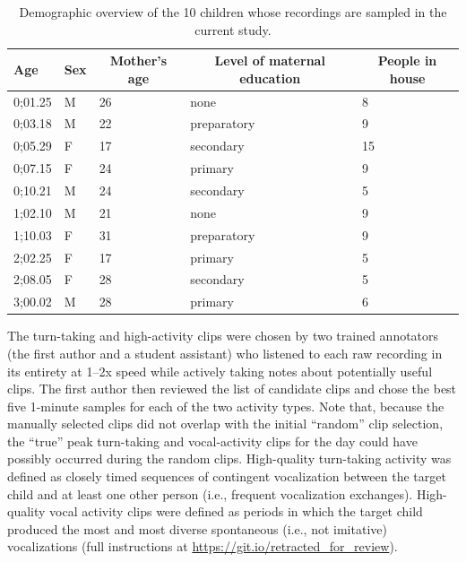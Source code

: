 \documentclass[floatsintext,man]{apa6}
\theoremstyle{definition}
\theoremstyle{definition}
\theoremstyle{definition}
\theoremstyle{remark}
\begin{document}
\begin{table}[tbp]
\begin{center}
\begin{threeparttable}
\caption{\label{tab:tab1}Demographic overview of the 10 children whose recordings are sampled in the current study.}
\begin{tabular}{lllll}
\toprule
Age & \multicolumn{1}{c}{Sex} & \multicolumn{1}{c}{Mother's age} & \multicolumn{1}{c}{Level of maternal education} & \multicolumn{1}{c}{People in house}\\
\midrule
0;01.25 & M & 26 & none & 8\\
0;03.18 & M & 22 & preparatory & 9\\
0;05.29 & F & 17 & secondary & 15\\
0;07.15 & F & 24 & primary & 9\\
0;10.21 & M & 24 & secondary & 5\\
1;02.10 & M & 21 & none & 9\\
1;10.03 & F & 31 & preparatory & 9\\
2;02.25 & F & 17 & primary & 5\\
2;08.05 & F & 28 & secondary & 5\\
3;00.02 & M & 28 & primary & 6\\
\bottomrule
\end{tabular}
\end{threeparttable}
\end{center}
\end{table}

The turn-taking and high-activity clips were chosen by two trained
annotators (the first author and a student assistant) who listened to
each raw recording in its entirety at 1--2x speed while actively taking
notes about potentially useful clips. The first author then reviewed the
list of candidate clips and chose the best five 1-minute samples for
each of the two activity types. Note that, because the manually selected
clips did not overlap with the initial \enquote{random} clip selection,
the \enquote{true} peak turn-taking and vocal-activity clips for the day
could have possibly occurred during the random clips. High-quality
turn-taking activity was defined as closely timed sequences of
contingent vocalization between the target child and at least one other
person (i.e., frequent vocalization exchanges). High-quality vocal
activity clips were defined as periods in which the target child
produced the most and most diverse spontaneous (i.e., not imitative)
vocalizations (full instructions at
\url{https://git.io/retracted_for_review}).
\end{document}
